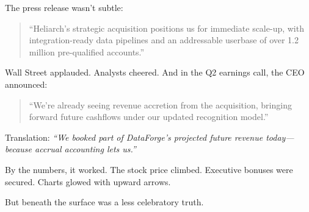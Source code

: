 The press release wasn’t subtle:
\begin{quote}
“Heliarch’s strategic acquisition positions us for immediate scale-up, with integration-ready data pipelines and an addressable userbase of over 1.2 million pre-qualified accounts.”
\end{quote}

Wall Street applauded. Analysts cheered.  
And in the Q2 earnings call, the CEO announced:
\begin{quote}
“We’re already seeing revenue accretion from the acquisition, bringing forward future cashflows under our updated recognition model.”
\end{quote}

Translation:  
\textit{“We booked part of DataForge’s projected future revenue today—because accrual accounting lets us.”}

By the numbers, it worked.  
The stock price climbed. Executive bonuses were secured.  
Charts glowed with upward arrows.

But beneath the surface was a less celebratory truth.


